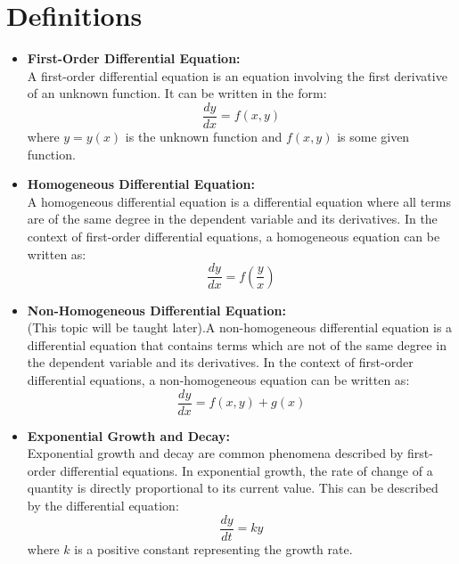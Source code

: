 \documentclass[a4paper,12pt]{article}
\begin{document}
\section{Definitions}
\begin{itemize}
    \item \textbf{First-Order Differential Equation:}\\
A first-order differential equation is an equation involving the first derivative of an unknown function. It can be written in the form:
\begin{equation}
    \frac{dy}{dx} = f(x, y)
\end{equation}
where \( y = y(x) \) is the unknown function and \( f(x, y) \) is some given function.

\item \textbf{Homogeneous Differential Equation:}\\
A homogeneous differential equation is a differential equation where all terms are of the same degree in the dependent variable and its derivatives. In the context of first-order differential equations, a homogeneous equation can be written as:
\begin{equation}
    \frac{dy}{dx} = f\left(\frac{y}{x}\right)
\end{equation}

\item \textbf{Non-Homogeneous Differential Equation:}\\
(This topic will be taught later).A non-homogeneous differential equation is a differential equation that contains terms which are not of the same degree in the dependent variable and its derivatives. In the context of first-order differential equations, a non-homogeneous equation can be written as:
\begin{equation}
    \frac{dy}{dx} = f(x, y) + g(x)
\end{equation}

\item \textbf{Exponential Growth and Decay:}\\
Exponential growth and decay are common phenomena described by first-order differential equations. In exponential growth, the rate of change of a quantity is directly proportional to its current value. This can be described by the differential equation:
\begin{equation}
    \frac{dy}{dt} = ky
\end{equation}
where \( k \) is a positive constant representing the growth rate.


\end{itemize}
\end{document}
